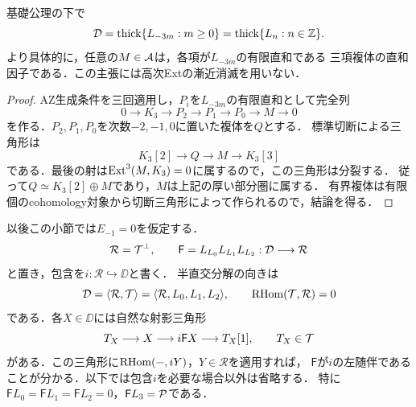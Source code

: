 \documentclass[11pt,a4paper]{ltjsarticle}
\begin{document}
\begin{lemma}[軌道対象による厚い生成]\label{lem:orbitthickgeneration}
基礎公理の下で
\[
 \mathcal D=\operatorname{thick}\{L_{-3m}:m\geq0\}
      =\operatorname{thick}\{L_n:n\in\mathbb Z\}.
\]
より具体的に，任意の$M\in\mathcal A$は，各項が$L_{-3m}$の有限直和である
三項複体の直和因子である．この主張には高次Extの漸近消滅を用いない．
\end{lemma}
\begin{proof}
AZ生成条件を三回適用し，$P_i$を$L_{-3m}$の有限直和として完全列
\[
 0\longrightarrow K_3\longrightarrow P_2\longrightarrow P_1
 \longrightarrow P_0\longrightarrow M\longrightarrow0
\]
を作る．$P_2,P_1,P_0$を次数$-2,-1,0$に置いた複体を$Q$とする．
標準切断による三角形は
\[
 K_3[2]\longrightarrow Q\longrightarrow M
 \longrightarrow K_3[3]
\]
である．最後の射は$\operatorname{Ext}^3(M,K_3)=0$に属するので，この三角形は分裂する．
従って$Q\simeq K_3[2]\oplus M$であり，$M$は上記の厚い部分圏に属する．
有界複体は有限個のcohomology対象から切断三角形によって作られるので，結論を得る．
\end{proof}

以後この小節では$E_{-1}=0$を仮定する．
\[
 \mathcal R=\mathcal T^\perp,
 \qquad \mathsf F=L_{L_0}L_{L_1}L_{L_2}:\mathcal D\longrightarrow\mathcal R
\]
と置き，包含を$i:\mathcal R\hookrightarrow\DD$と書く．
半直交分解の向きは
\begin{equation}\label{eq:residualsod}
 \mathcal D=\langle\mathcal R,\mathcal T\rangle
     =\langle\mathcal R,L_0,L_1,L_2\rangle,
 \qquad \operatorname{RHom}(\mathcal T,\mathcal R)=0
\end{equation}
である．各$X\in\DD$には自然な射影三角形
\begin{equation}\label{eq:residualprojection}
 T_X\longrightarrow X\longrightarrow i\mathsf F X\longrightarrow T_X[1],
 \qquad T_X\in\mathcal T
\end{equation}
がある．この三角形に$\operatorname{RHom}(-,iY)$，$Y\in\mathcal R$を適用すれば，
$\mathsf F$が$i$の左随伴であることが分かる．以下では包含$i$を必要な場合以外は省略する．
特に$\mathsf F L_0=\mathsf F L_1=\mathsf F L_2=0$，$\mathsf F L_3=\mathcal P$である．
\end{document}
